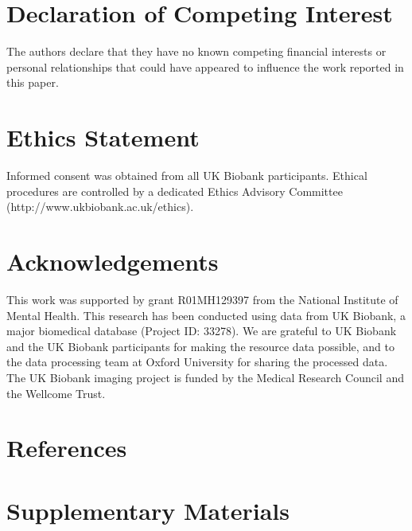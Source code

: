 \documentclass[
  authoryear,
  preprint,
  1p]{elsarticle}
\begin{document}
\section*{Declaration of Competing
Interest}\label{declaration-of-competing-interest}

The authors declare that they have no known competing financial
interests or personal relationships that could have appeared to
influence the work reported in this paper.

\section*{Ethics Statement}\label{ethics-statement}

Informed consent was obtained from all UK Biobank participants. Ethical
procedures are controlled by a dedicated Ethics Advisory Committee
(http://www.ukbiobank.ac.uk/ethics).

\section*{Acknowledgements}\label{acknowledgements}

This work was supported by grant R01MH129397 from the National Institute
of Mental Health. This research has been conducted using data from UK
Biobank, a major biomedical database (Project ID: 33278). We are
grateful to UK Biobank and the UK Biobank participants for making the
resource data possible, and to the data processing team at Oxford
University for sharing the processed data. The UK Biobank imaging
project is funded by the Medical Research Council and the Wellcome
Trust.

\section*{References}\label{references}

\renewcommand{\bibsection}{}


\newpage
\appendix

\section{Supplementary Materials}\label{sec-supplements}
\end{document}
